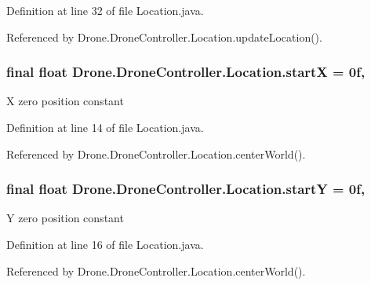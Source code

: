 Definition at line 32 of file Location.\+java.



Referenced by Drone.\+Drone\+Controller.\+Location.\+update\+Location().

\hypertarget{class_drone_1_1_drone_controller_1_1_location_a717eb6f5ed5b60516278f742b945ef85}{}
\subsubsection[{start\+X}]{\setlength{\rightskip}{0pt plus 5cm}final float Drone.\+Drone\+Controller.\+Location.\+start\+X = 0f\hspace{0.3cm}{\ttfamily [static]}, {\ttfamily [private]}}\label{class_drone_1_1_drone_controller_1_1_location_a717eb6f5ed5b60516278f742b945ef85}
X zero position constant 

Definition at line 14 of file Location.\+java.



Referenced by Drone.\+Drone\+Controller.\+Location.\+center\+World().

\hypertarget{class_drone_1_1_drone_controller_1_1_location_a2866e66897bce229fe5f1da071a16e09}{}
\subsubsection[{start\+Y}]{\setlength{\rightskip}{0pt plus 5cm}final float Drone.\+Drone\+Controller.\+Location.\+start\+Y = 0f\hspace{0.3cm}{\ttfamily [static]}, {\ttfamily [private]}}\label{class_drone_1_1_drone_controller_1_1_location_a2866e66897bce229fe5f1da071a16e09}
Y zero position constant 

Definition at line 16 of file Location.\+java.



Referenced by Drone.\+Drone\+Controller.\+Location.\+center\+World().

\hypertarget{class_drone_1_1_drone_controller_1_1_location_a90680b96f92953fa20ff7f91ed83f971}{}
